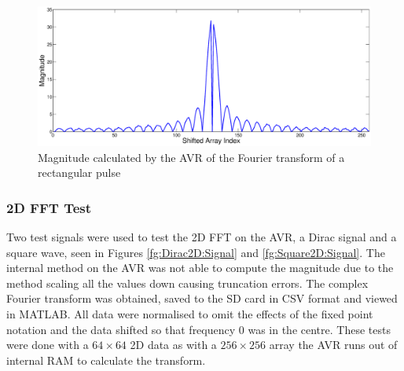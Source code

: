 \begin{figure}
\includegraphics[width=\textwidth]{./Figures/AVR_FFT_Square_Mag.eps}
\caption{Magnitude calculated by the AVR of the Fourier transform of a rectangular pulse}
\label{fig:AVR:FFT:Square:Mag}
\end{figure}

\subsubsection{2D FFT Test}

Two test signals were used to test the 2D FFT on the AVR, a Dirac signal and a square wave, seen in Figures \ref{fg:Dirac2D:Signal} and \ref{fg:Square2D:Signal}. The internal method on the AVR was not able to compute the magnitude due to the method scaling all the values down causing truncation errors. The complex Fourier transform was obtained, saved to the SD card in CSV format and viewed in MATLAB. All data were normalised to omit the effects of the fixed point notation and the data shifted so that frequency 0 was in the centre. These tests were done with a $64\times64$ 2D data as with a $256 \times 256$ array the AVR runs out of internal RAM to calculate the transform. 

